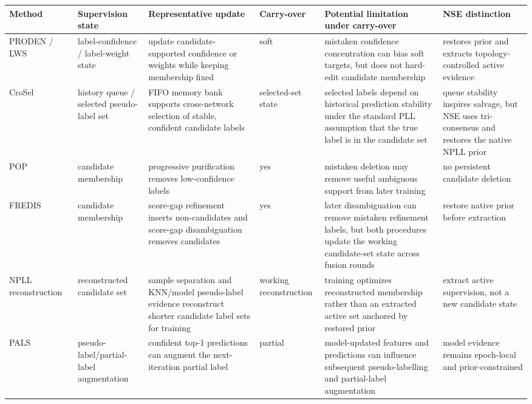 \begin{table}[t]
\centering
\scriptsize
\setlength{\tabcolsep}{2pt}
\begin{tabular}{p{}p{}p{}p{}p{}p{}}
\toprule
\textbf{Method} & \textbf{Supervision state} & \textbf{Representative update} & \textbf{Carry-over} & \textbf{Potential limitation under carry-over} & \textbf{NSE distinction} \\
\midrule
PRODEN / LWS~\cite{lv2020progressive,wen2021leveraged} & label-confidence / label-weight state & update candidate-supported confidence or weights while keeping membership fixed & soft & mistaken confidence concentration can bias soft targets, but does not hard-edit candidate membership & restores prior and extracts topology-controlled active evidence \\
\hline
CroSel~\cite{tian2024crosel} & history queue / selected pseudo-label set & FIFO memory bank supports cross-network selection of stable, confident candidate labels & selected-set state & selected labels depend on historical prediction stability under the standard PLL assumption that the true label is in the candidate set & queue stability inspires salvage, but NSE uses tri-consensus and restores the native NPLL prior \\
\hline
POP~\cite{xu2022pop} & candidate membership & progressive purification removes low-confidence labels & yes & mistaken deletion may remove useful ambiguous support from later training & no persistent candidate deletion \\
\hline
FREDIS~\cite{qiao2023fredis} & candidate membership & score-gap refinement inserts non-candidates and score-gap disambiguation removes candidates & yes & later disambiguation can remove mistaken refinement labels, but both procedures update the working candidate-set state across fusion rounds & restore native prior before extraction \\
\hline
NPLL reconstruction~\cite{peng2025noise} & reconstructed candidate set & sample separation and KNN/model pseudo-label evidence reconstruct shorter candidate label sets for training & working reconstruction & training optimizes reconstructed membership rather than an extracted active set anchored by restored prior & extract active supervision, not a new candidate state \\
\hline
PALS~\cite{pals2025} & pseudo-label/partial-label augmentation & confident top-1 predictions can augment the next-iteration partial label & partial & model-updated features and predictions can influence subsequent pseudo-labelling and partial-label augmentation & model evidence remains epoch-local and prior-constrained \\

\end{tabular}
\end{table}
